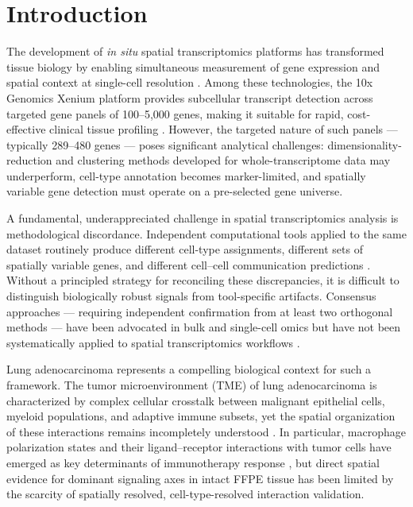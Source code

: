 \documentclass[12pt,a4paper]{article}
\begin{document}
\section*{Introduction}
\label{sec:intro}
The development of \textit{in situ} spatial transcriptomics platforms has transformed tissue biology by enabling simultaneous measurement of gene expression and spatial context at single-cell resolution \citep{moses2022museum}. Among these technologies, the 10x Genomics Xenium platform provides subcellular transcript detection across targeted gene panels of 100--5,000 genes, making it suitable for rapid, cost-effective clinical tissue profiling \citep{janesick2023high}. However, the targeted nature of such panels --- typically 289--480 genes --- poses significant analytical challenges: dimensionality-reduction and clustering methods developed for whole-transcriptome data may underperform, cell-type annotation becomes marker-limited, and spatially variable gene detection must operate on a pre-selected gene universe.

A fundamental, underappreciated challenge in spatial transcriptomics analysis is methodological discordance. Independent computational tools applied to the same dataset routinely produce different cell-type assignments, different sets of spatially variable genes, and different cell--cell communication predictions \citep{dimitrov2022comparison, efremova2020cellphonedb}. Without a principled strategy for reconciling these discrepancies, it is difficult to distinguish biologically robust signals from tool-specific artifacts. Consensus approaches --- requiring independent confirmation from at least two orthogonal methods --- have been advocated in bulk and single-cell omics but have not been systematically applied to spatial transcriptomics workflows \citep{luecken2019current}.

Lung adenocarcinoma represents a compelling biological context for such a framework. The tumor microenvironment (TME) of lung adenocarcinoma is characterized by complex cellular crosstalk between malignant epithelial cells, myeloid populations, and adaptive immune subsets, yet the spatial organization of these interactions remains incompletely understood \citep{laughney2020regenerative, wu2021single}. In particular, macrophage polarization states and their ligand--receptor interactions with tumor cells have emerged as key determinants of immunotherapy response \citep{cassetta2020targeting}, but direct spatial evidence for dominant signaling axes in intact FFPE tissue has been limited by the scarcity of spatially resolved, cell-type-resolved interaction validation.
\end{document}
